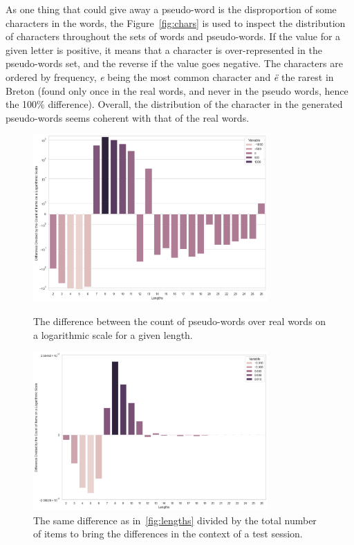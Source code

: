 As one thing that could give away a pseudo-word is the disproportion of some characters in the words, the Figure~\ref{fig:chars} is used to inspect the distribution of characters throughout the sets of words and pseudo-words. If the value for a given letter is positive, it means that a character is over-represented in the pseudo-words set, and the reverse if the value goes negative. The characters are ordered by frequency, \textit{e} being the most common character and \textit{ë} the rarest in Breton (found only once in the real words, and never in the pseudo words, hence the 100\% difference). Overall, the distribution of the character in the generated pseudo-words seems coherent with that of the real words.

\begin{figure}[htbp]
    \centering
    \begin{minipage}{0.45\textwidth}
        \centering
        \includegraphics[width=0.8\textwidth]{figures/lengths.png}
        \caption{The difference between the count of pseudo-words over real words on a logarithmic scale for a given length.}\label{fig:lengths}
    \end{minipage}
    \hfill
    \begin{minipage}{0.45\textwidth}
        \centering
        \includegraphics[width=0.8\textwidth]{figures/lengths_divided.png}
        \caption{The same difference as in~\ref{fig:lengths} divided by the total number of items to bring the differences in the context of a test session.}\label{fig:lengths_div}
    \end{minipage}
\end{figure}



